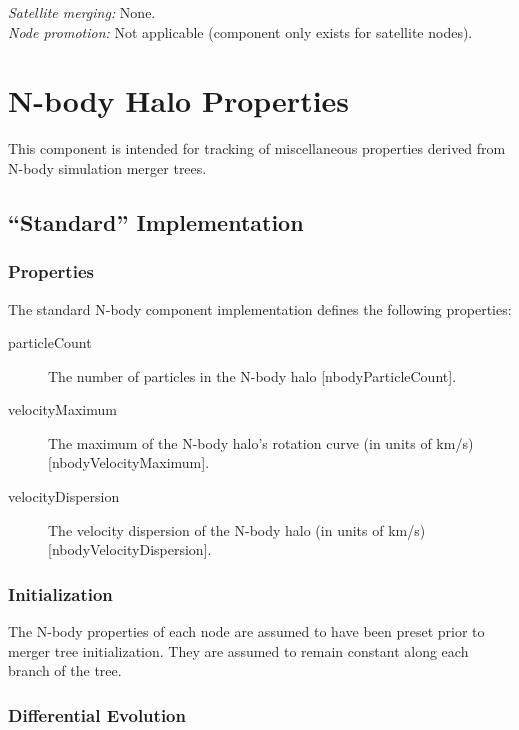 \noindent\emph{Satellite merging:} None.\\

\noindent\emph{Node promotion:} Not applicable (component only exists for satellite nodes).\\

\section{N-body Halo Properties}

This component is intended for tracking of miscellaneous properties derived from N-body simulation merger trees.

\subsection{``Standard'' Implementation}

\subsubsection{Properties}

The standard N-body component implementation defines the following properties:
\begin{description}
 \item [{\normalfont \ttfamily particleCount}] The number of particles in the N-body halo [{\normalfont \ttfamily nbodyParticleCount}].
 \item [{\normalfont \ttfamily velocityMaximum}] The maximum of the N-body halo's rotation curve (in units of km/s) [{\normalfont \ttfamily nbodyVelocityMaximum}].
 \item [{\normalfont \ttfamily velocityDispersion}] The velocity dispersion of the N-body halo (in units of km/s) [{\normalfont \ttfamily nbodyVelocityDispersion}].
\end{description}

\subsubsection{Initialization}

The N-body properties of each \gls{node} are assumed to have been preset prior to merger tree initialization. They are assumed to remain constant along each branch of the tree.

\subsubsection{Differential Evolution}

